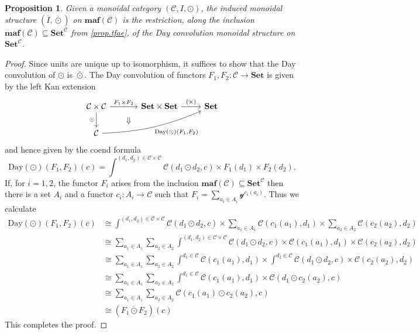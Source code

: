 \documentclass[11pt, one side, article]{memoir}
\theoremstyle{definition}
\theoremstyle{plain}
\newtheorem{proposition}[definitionx]{Proposition}
\renewcommand{\ss}{\subseteq}
\newcommand{\cat}[1]{\mathcal{#1}}%
\newcommand{\Cat}[1]{\mathbf{#1}}%
\newcommand{\Fun}[1]{\mathrm{#1}}%
\newcommand{\ol}[1]{\overline{#1}}
\newcommand{\smset}{\Cat{Set}}
\newcommand{\yon}{\mathcal{y}}
\newcommand{\0}{\Cat{0}}
\newcommand{\1}{\Cat{1}}
\newcommand{\olodot}{\mathbin{\ol{\odot}}}
\newcommand{\opfam}{\Cat{maf}}
\begin{document}
\begin{proposition}
Given a monoidal category $(\cat{C},I,\odot)$, the induced monoidal structure $(\ol{I},\olodot)$ on $\opfam(\cat{C})$ is the restriction, along the inclusion $\opfam(\cat{C})\ss\smset^\cat{C}$ from \cref{prop.tfae}, of the Day convolution monoidal structure on $\smset^{\cat{C}}$.
\end{proposition}
\begin{proof}
Since units are unique up to isomorphism, it suffices to show that the Day convolution of $\odot$ is $\olodot$. The Day convolution of functors $F_1,F_2\colon\cat{C}\to\smset$ is given by the left Kan extension
\[
\begin{tikzcd}
  \cat{C}\times\cat{C}\ar[r, "F_1\times F_2"]\ar[d, "\odot"']\ar[dr, phantom, pos=.4, "\Downarrow"]&[10pt]
  \smset\times\smset\ar[r, "{(\times)}"]&
  \smset\\
  \cat{C}\ar[urr, bend right=10pt, "{\Fun{Day}(\odot)(F_1,F_2)}"']&~
\end{tikzcd}
\]
and hence given by the coend formula
\[
\Fun{Day}(\odot)(F_1,F_2)(c)=\int^{(d_1,d_2)\in\cat{C}\times\cat{C}}\cat{C}(d_1\odot d_2,c)\times F_1(d_1)\times F_2(d_2).
\]
If, for $i=1,2$, the functor $F_i$ arises from the inclusion $\opfam(\cat{C})\ss\smset^\cat{C}$ then there is a set $A_i$ and a functor $c_i\colon A_i\to\cat{C}$ such that $F_i=\sum_{a_i\in A_i}\yon^{c_i(a_i)}$. Thus we calculate
\begin{align*}
	\Fun{Day}(\odot)(F_1,F_2)(c)&\cong
	\int^{(d_1,d_2)\in\cat{C}\times\cat{C}}\cat{C}(d_1\odot d_2,c)\times \sum_{a_1\in A_1}\cat{C}(c_1(a_1), d_1)\times \sum_{a_2\in A_2}\cat{C}(c_2(a_2), d_2)\\&\cong
	\sum_{a_1\in A_1}\sum_{a_2\in A_2}\int^{(d_1,d_2)\in\cat{C}\times\cat{C}}\cat{C}(d_1\odot d_2,c)\times\cat{C}(c_1(a_1), d_1)\times\cat{C}(c_2(a_2), d_2)\\&\cong
	\sum_{a_1\in A_1}\sum_{a_2\in A_2}\int^{d_1\in\cat{C}}\cat{C}(c_1(a_1), d_1)\times\int^{d_2\in\cat{C}}\cat{C}(d_1\odot d_2,c)\times\cat{C}(c_2(a_2), d_2)\\&\cong
	\sum_{a_1\in A_1}\sum_{a_2\in A_2}\int^{d_1\in\cat{C}}\cat{C}(c_1(a_1), d_1)\times\cat{C}(d_1\odot c_2(a_2),c)\\&\cong
	\sum_{a_1\in A_1}\sum_{a_2\in A_2}\cat{C}(c_1(a_1)\odot c_2(a_2),c)\\&\cong
	(F_1\olodot F_2)(c)
\end{align*}
This completes the proof.
\end{proof}
\end{document}
